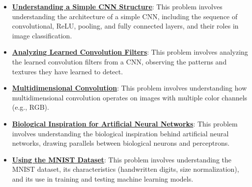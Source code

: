 \documentclass{article}%
\begin{document}
\begin{itemize}[leftmargin=*]
\item \href{https://purdue.brightspace.com/d2l/common/assets/pdfjs-d2l-dist/1.0.14-legacy/web/viewer.html?file=\%2Fcontent\%2Fenforced\%2F1095467-wl.202510.CS.24300.001\%2F09L1-cnn.pdf\%3Fou\%3D1095467\&lang=en-us\&container=d2l-fileviewer-rendered-pdf\&fullscreen=d2l-fileviewer-rendered-pdf-dialog\&height=667#page=17}{\textbf{Understanding a Simple CNN Structure}}: This problem involves understanding the architecture of a simple CNN, including the sequence of convolutional, ReLU, pooling, and fully connected layers, and their roles in image classification.%
\item \href{https://purdue.brightspace.com/d2l/common/assets/pdfjs-d2l-dist/1.0.14-legacy/web/viewer.html?file=\%2Fcontent\%2Fenforced\%2F1095467-wl.202510.CS.24300.001\%2F09L1-cnn.pdf\%3Fou\%3D1095467\&lang=en-us\&container=d2l-fileviewer-rendered-pdf\&fullscreen=d2l-fileviewer-rendered-pdf-dialog\&height=667#page=18}{\textbf{Analyzing Learned Convolution Filters}}: This problem involves analyzing the learned convolution filters from a CNN, observing the patterns and textures they have learned to detect.%
\item \href{https://purdue.brightspace.com/d2l/common/assets/pdfjs-d2l-dist/1.0.14-legacy/web/viewer.html?file=\%2Fcontent\%2Fenforced\%2F1095467-wl.202510.CS.24300.001\%2F09L1-cnn.pdf\%3Fou\%3D1095467\&lang=en-us\&container=d2l-fileviewer-rendered-pdf\&fullscreen=d2l-fileviewer-rendered-pdf-dialog\&height=667#page=19}{\textbf{Multidimensional Convolution}}: This problem involves understanding how multidimensional convolution operates on images with multiple color channels (e.g., RGB).%
\item \href{https://purdue.brightspace.com/d2l/common/assets/pdfjs-d2l-dist/1.0.14-legacy/web/viewer.html?file=\%2Fcontent\%2Fenforced\%2F1095467-wl.202510.CS.24300.001\%2F09L1-cnn.pdf\%3Fou\%3D1095467\&lang=en-us\&container=d2l-fileviewer-rendered-pdf\&fullscreen=d2l-fileviewer-rendered-pdf-dialog\&height=667#page=20}{\textbf{Biological Inspiration for Artificial Neural Networks}}: This problem involves understanding the biological inspiration behind artificial neural networks, drawing parallels between biological neurons and perceptrons.%
\item \href{https://purdue.brightspace.com/d2l/common/assets/pdfjs-d2l-dist/1.0.14-legacy/web/viewer.html?file=\%2Fcontent\%2Fenforced\%2F1095467-wl.202510.CS.24300.001\%2F09L1-cnn.pdf\%3Fou\%3D1095467\&lang=en-us\&container=d2l-fileviewer-rendered-pdf\&fullscreen=d2l-fileviewer-rendered-pdf-dialog\&height=667#page=21}{\textbf{Using the MNIST Dataset}}: This problem involves understanding the MNIST dataset, its characteristics (handwritten digits, size normalization), and its use in training and testing machine learning models.%

\end{itemize}
\end{document}
